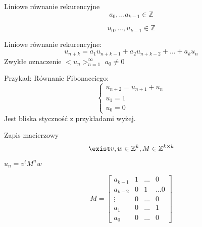 \documentclass{beamer}
\theoremstyle{definition}
\begin{document}
\begin{frame}{Liniowe równanie rekurencyjne}
    $$
        a_0, \ldots a_{k-1} \in \mathbb{Z} 
    $$

    $$
        u_0, \ldots, u_{k-1} \in \mathbb{Z}
    $$


    Liniowe równanie rekurencyjne: 
    $$
    u_{n+k}=a_{1} u_{n+k-1}+a_{2} u_{n+k-2}+\ldots+a_{k} u_{n}
    $$
    Zwykłe oznaczenie $<u_n>_{n=1}^{\infty}$
    $a_0 \neq 0$
\end{frame}

\begin{frame}
    Przykad:
    Równanie Fibonacciego:
   \begin{equation*}
        \begin{cases}
        u_{n+2} = u_{n+1} + u_n \\
        u_{1} = 1 \\
        u_{0} = 0
        \end{cases}
    \end{equation*}
    Jest bliska styczność z przykładami wyżej. 

\end{frame}

\begin{frame}{Zapis macierzowy}
    $$\exist v, w \in \mathbb{Z}^{k}, M \in \mathbb{Z}^{k\times k} $$
    $u_n = v^{t}M^{n}w$

    $$
    M = \begin{bmatrix}
    a_{k-1} & 1 &  \ldots & 0 \\
    a_{k-2} & 0 & 1 & \ldots 0  \\
    \vdots & 0 & \ldots & 0 \\ 
    a_1 & 0 & \ldots & 1 \\
    a_0 & 0 & \ldots & 0
    \end{bmatrix}
    $$
\end{frame}
\end{document}
